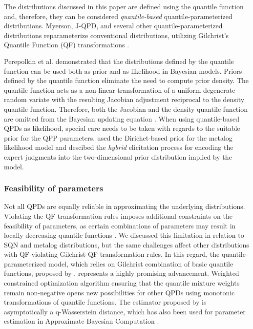 \documentclass[
  fleqn,
  deca,
  blindrev
]{informs4}
\begin{document}
The distributions discussed in this paper are defined using the quantile
function and, therefore, they can be considered \emph{quantile-based}
quantile-parameterized distributions. Myerson, J-QPD, and several other
quantile-parameterized distributions reparameterize conventional
distributions, utilizing Gilchrist's Quantile Function (QF)
transformations \citep{gilchrist2000StatisticalModellingQuantile}.

Perepolkin et al. \citep{perepolkin2023TenetsQuantilebasedInference}
demonstrated that the distributions defined by the quantile function can
be used both as prior and as likelihood in Bayesian models. Priors
defined by the quantile function eliminate the need to compute prior
density. The quantile function acts as a non-linear transformation of a
uniform degenerate random variate with the resulting Jacobian adjustment
reciprocal to the density quantile function. Therefore, both the
Jacobian and the density quantile function are omitted from the Bayesian
updating equation \citep{perepolkin2023TenetsQuantilebasedInference}.
When using quantile-based QPDs as likelihood, special care needs to be
taken with regards to the suitable prior for the QPP parameters.
\citep{perepolkin2021HybridElicitationIndirect} used the Dirichet-based
prior for the metalog likelihood model and descibed the \emph{hybrid}
elicitation process for encoding the expert judgments into the
two-dimensional prior distribution implied by the model.

\subsubsection*{Feasibility of
parameters}\label{feasibility-of-parameters}

Not all QPDs are equally reliable in approximating the underlying
distributions. Violating the QF transformation rules imposes additional
constraints on the feasibility of parameters, as certain combinations of
parameters may result in locally decreasing quantile functions
\citep{keelin2016MetalogDistributions, hadlock2017QuantileparameterizedMethodsQuantifying}.
We discussed this limitation in relation to SQN and metalog
distributions, but the same challenges affect other distributions with
QF violating Gilchrist QF transformation rules. In this regard, the
quantile-parameterized model, which relies on Gilchrist combination of
basic quantile functions, proposed by
\citep{peng2023MixtureQuantilesEstimated}, represents a highly promising
advancement. Weighted constrained optimization algorithm ensuring that
the quantile mixture weights remain non-negative opens new possibilities
for other QPDs using monotonic transformations of quantile functions.
The estimator proposed by \citep{peng2023MixtureQuantilesEstimated} is
asymptotically a q-Wasserstein distance, which has also been used for
parameter estimation in Approximate Bayesian Computation
\citep{bernton2019ParameterEstimationWasserstein}.
\end{document}
